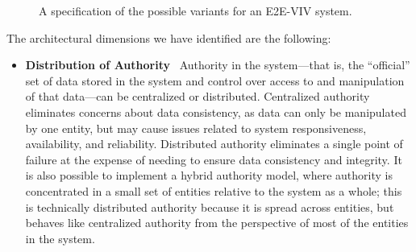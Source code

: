 \begin{figure}
\begin{center}

\end{center}
\caption{A specification of the possible variants for an E2E-VIV system.}
\label{figure:arch-choices}
\end{figure}

The architectural dimensions we have identified are the following:

\begin{itemize}
\item \textbf{Distribution of Authority} \ Authority in the
  system---that is, the ``official'' set of data stored in the system
  and control over access to and manipulation of that data---can be
  centralized or distributed. Centralized authority eliminates
  concerns about data consistency, as data can only be manipulated by
  one entity, but may cause issues related to system responsiveness,
  availability, and reliability. Distributed authority eliminates a
  single point of failure at the expense of needing to ensure data
  consistency and integrity. It is also possible to implement a hybrid
  authority model, where authority is concentrated in a small set of
  entities relative to the system as a whole; this is technically
  distributed authority because it is spread across entities, but
  behaves like centralized authority from the perspective of most of
  the entities in the system.


\end{itemize}
